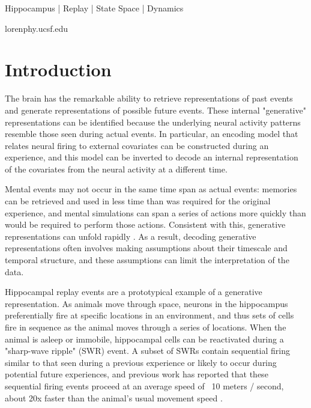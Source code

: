\documentclass[times, twoside]{zHenriquesLab-StyleBioRxiv}
\begin{document}
\begin{keywords}
Hippocampus | Replay | State Space | Dynamics
\end{keywords}

\begin{corrauthor}
loren\at phy.ucsf.edu
\end{corrauthor}

\section*{Introduction}

The brain has the remarkable ability to retrieve representations of past events and generate representations of possible future events. These internal "generative" representations \cite{KayConstantSubsecondCycling2020} can be identified because the underlying neural activity patterns resemble those seen during actual events. In particular, an encoding model that relates neural firing to external covariates can be constructed during an experience, and this model can be inverted to decode an internal representation of the covariates from the neural activity at a different time.

Mental events may not occur in the same time span as actual events: memories can be retrieved and used in less time than was required for the original experience, and mental simulations can span a series of actions more quickly than would be required to perform those actions. Consistent with this, generative representations can unfold rapidly \cite{NadasdyReplayTimeCompression1999, LeeMemorySequentialExperience2002, DavidsonHippocampalReplayExtended2009, KarlssonAwakereplayremote2009}. As a result, decoding generative representations often involves making assumptions about their timescale and temporal structure, and these assumptions can limit the interpretation of the data.

Hippocampal replay events are a prototypical example of a generative representation. As animals move through space, neurons in the hippocampus preferentially fire at specific locations in an environment, and thus sets of cells fire in sequence as the animal moves through a series of locations. When the animal is asleep or immobile, hippocampal cells can be reactivated during a "sharp-wave ripple" (SWR) event. A subset of SWRs contain sequential firing similar to that seen during a previous experience or likely to occur during potential future experiences, and previous work has reported that these sequential firing events proceed at an average speed of ~10 meters / second, about 20x faster than the animal's usual movement speed \cite{NadasdyReplayTimeCompression1999, LeeMemorySequentialExperience2002, DavidsonHippocampalReplayExtended2009, KarlssonAwakereplayremote2009}. 
\end{document}
